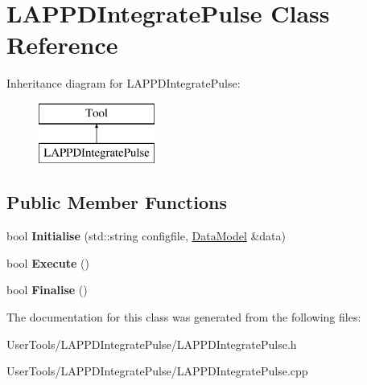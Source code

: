 \hypertarget{classLAPPDIntegratePulse}{\section{L\-A\-P\-P\-D\-Integrate\-Pulse Class Reference}
\label{classLAPPDIntegratePulse}
}
Inheritance diagram for L\-A\-P\-P\-D\-Integrate\-Pulse\-:\begin{figure}[H]
\begin{center}
\leavevmode
\includegraphics[height=2.000000cm]{classLAPPDIntegratePulse}
\end{center}
\end{figure}
\subsection*{Public Member Functions}
\begin{DoxyCompactItemize}
\item 
\hypertarget{classLAPPDIntegratePulse_ab68036bfa8f3ae98552907590df7d57a}{bool {\bfseries Initialise} (std\-::string configfile, \hyperlink{classDataModel}{Data\-Model} \&data)}\label{classLAPPDIntegratePulse_ab68036bfa8f3ae98552907590df7d57a}

\item 
\hypertarget{classLAPPDIntegratePulse_ada15e2fbf5c978255a848d0e8dce064a}{bool {\bfseries Execute} ()}\label{classLAPPDIntegratePulse_ada15e2fbf5c978255a848d0e8dce064a}

\item 
\hypertarget{classLAPPDIntegratePulse_ab17c0fe3193abd1970c6148049bacc18}{bool {\bfseries Finalise} ()}\label{classLAPPDIntegratePulse_ab17c0fe3193abd1970c6148049bacc18}

\end{DoxyCompactItemize}


The documentation for this class was generated from the following files\-:\begin{DoxyCompactItemize}
\item 
User\-Tools/\-L\-A\-P\-P\-D\-Integrate\-Pulse/L\-A\-P\-P\-D\-Integrate\-Pulse.\-h\item 
User\-Tools/\-L\-A\-P\-P\-D\-Integrate\-Pulse/L\-A\-P\-P\-D\-Integrate\-Pulse.\-cpp\end{DoxyCompactItemize}
